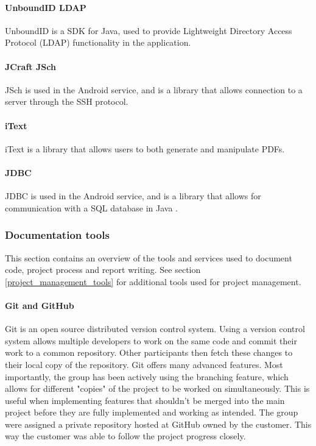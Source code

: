 \paragraph*{UnboundID LDAP}
UnboundID \cite{unboundid} is a SDK for Java, used to provide Lightweight Directory Access Protocol (LDAP) functionality in the application. 

\paragraph*{JCraft JSch}
JSch \cite{jsch} is used in the Android service, and is a library that allows connection to a server through the SSH protocol. 

\paragraph*{iText}
\label{itextlib}
iText \cite{itext} is a library that allows users to both generate and manipulate PDFs. 

\paragraph*{JDBC}
JDBC is used in the Android service, and is a library that allows for communication with a SQL database in Java \cite{JDBC}.

\subsubsection{Documentation tools}
This section contains an overview of the tools and services used to document code, project process and report writing. See section \ref{project_management_tools} for additional tools used for project management. 

\paragraph*{Git and GitHub}
Git \cite{git} is an open source distributed version control system. Using a version control system allows multiple developers to work on the same code and commit their work to a common repository. Other participants then fetch these changes to their local copy of the repository. Git offers many advanced features. Most importantly, the group has been actively using the branching feature, which allows for different "copies" of the project to be worked on simultaneously. This is useful when implementing features that shouldn't be merged into the main project before they are fully implemented and working as intended. The group were assigned a private repository hosted at GitHub \cite{github} owned by the customer. This way the customer was able to follow the project progress closely.

